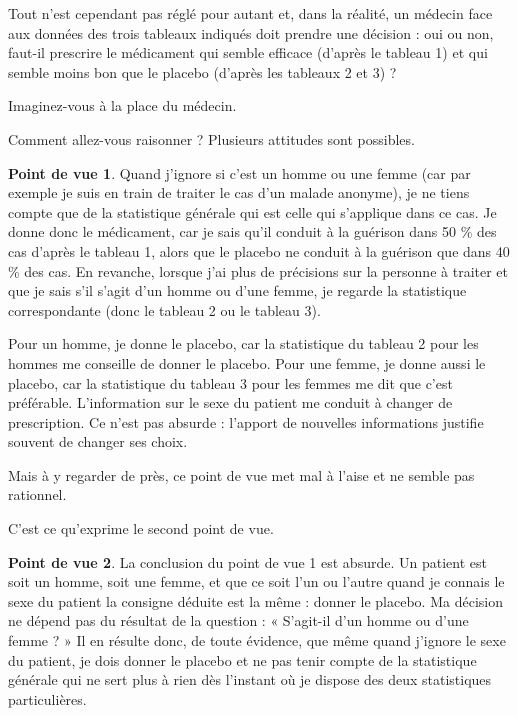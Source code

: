\documentclass[10pt,dvipsnames, dvips, svgnames]{article}
\begin{document}
Tout n'est cependant pas réglé pour autant et, dans la réalité, un médecin face aux données des trois tableaux indiqués doit prendre une décision : oui ou non, faut-il prescrire le médicament qui semble efficace (d'après le tableau 1) et qui semble moins bon que le placebo (d'après les tableaux 2 et 3) ?

Imaginez-vous à la place du médecin.

Comment allez-vous raisonner ? Plusieurs attitudes sont possibles.

\begin{list}{}{}
\item \textbf{Point de vue 1}. Quand j'ignore si c'est un homme ou une femme (car par exemple je suis en train de traiter le cas d'un malade anonyme), je ne tiens compte que de la statistique générale qui est celle qui s'applique dans ce cas.  
Je donne donc le médicament, car je sais qu'il conduit à la guérison dans 50 \% des cas d'après le tableau 1, alors que le placebo ne conduit à la guérison que dans 40 \% des cas. En revanche, lorsque j'ai plus de précisions sur la personne à traiter et que je sais s'il s'agit d'un homme ou d'une femme, je regarde la statistique correspondante (donc le tableau 2 ou le tableau 3).

Pour un homme, je donne le placebo, car la statistique du tableau 2 pour les hommes me conseille de donner le placebo. Pour une femme, je donne aussi le placebo, car la statistique du tableau 3 pour les femmes me dit que c'est préférable. L'information sur le sexe du patient me conduit à changer de prescription. Ce n'est pas absurde : l'apport de nouvelles informations justifie souvent de changer ses choix.

Mais à y regarder de près, ce point de vue met mal à l'aise et ne semble pas rationnel.

C'est ce qu'exprime le second point de vue.

\item \textbf{Point de vue 2}. La conclusion du point de vue 1 est absurde. Un patient est soit un homme, soit une femme, et que ce soit l'un ou l'autre quand je connais le sexe du patient la consigne déduite est la même : donner le placebo. Ma décision ne dépend pas du résultat de la question : « S'agit-il d'un homme ou d'une femme ? » Il en résulte donc, de toute évidence, que même quand j'ignore le sexe du patient, je dois donner le placebo et ne pas tenir compte de la statistique générale qui ne sert plus à rien dès l'instant où je dispose des deux statistiques particulières.  


\end{list}
\end{document}
